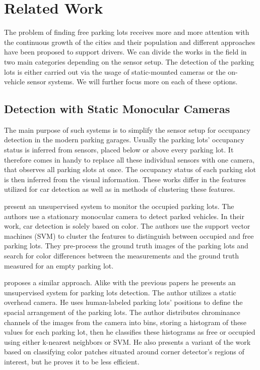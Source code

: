 \chapter{Related Work}
\label{cha:related_works}

The problem of finding free parking lots receives more and more attention with
the continuous growth of the cities and their population and different
approaches have been proposed to support drivers. We can divide the works in
the field in two main categories depending on the sensor setup. The detection
of the parking lots is either carried out via the usage of static-mounted
cameras or the on-vehicle sensor systems. We will further focus more on each
of these options.

\section{Detection with Static Monocular Cameras} %
\label{sec:detection_with_monocular_cameras}

The main purpose of such systems is to simplify the sensor setup for occupancy
detection in the modern parking garages. Usually the parking lots' occupancy
status is inferred from sensors, placed below or above every parking lot. It
therefore comes in handy to replace all these individual sensors with one
camera, that observes all parking slots at once. The occupancy status of each
parking slot is then inferred from the visual information. These works differ
in the features utilized for car detection as well as in methods of clustering
these features.

\citet{qizhang06} present an unsupervised system to monitor the occupied
parking lots. The authors use a stationary monocular camera to detect parked
vehicles. In their work, car detection is solely based on color. The authors
use the support vector machines (SVM) to cluster the features to distinguish
between occupied and free parking lots. They pre-process the ground truth
images of the parking lots and search for color differences between the
measurements and the ground truth measured for an empty parking lot.

\citet{nicolastrue} proposes a similar approach. Alike with the previous papers
he presents an unsupervised system for parking lots detection. The author
utilizes a static overhead camera. He uses human-labeled parking lots'
positions to define the spacial arrangement of the parking lots. The author
distributes chrominance channels of the images from the camera into bins,
storing a histogram of these values for each parking lot, then he classifies
these histograms as free or occupied using either k-nearest neighbors or
SVM\@. He also presents a variant of the work based on classifying color
patches situated around corner detector's regions of interest, but he proves
it to be less efficient.

